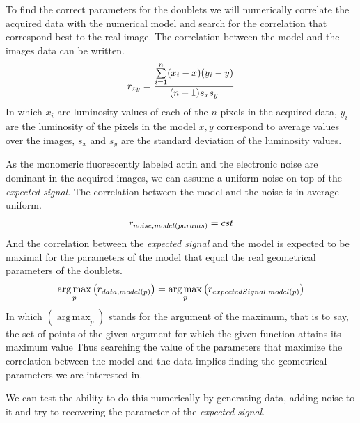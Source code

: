\documentclass[A4paperpaper,11pt,english]{sphinxmanual}
\begin{document}
To find the correct parameters for the doublets we will numerically correlate
the acquired data with the numerical model and search for the correlation
that correspond best to the real image. The correlation between the model and the images
data can be written.
\begin{gather}
\begin{split}r_{xy}=\frac{\sum\limits_{i=1}^n (x_i-\bar{x})(y_i-\bar{y})}{(n-1) s_x s_y}\end{split}\notag
\end{gather}
In which \(x_i\) are luminosity values of each of the \(n\) pixels in
the acquired data, \(y_i\) are the luminosity of the pixels in the model
\(\bar{x},\bar{y}\) correspond to average values over the images,
\(s_x\) and \(s_y\) are the standard deviation of the luminosity
values.

As the monomeric fluorescently labeled actin and the electronic noise are dominant
in the acquired images, we can assume a uniform noise on top of the \emph{expected signal}. The correlation between the model and the noise is in average
uniform.
\begin{gather}
\begin{split}r_{noise,model(params)} = cst\end{split}\notag
\end{gather}
And the correlation between the \emph{expected signal} and the model is expected to be
maximal for the parameters of the model that  equal the real geometrical
parameters of the doublets.
\begin{gather}
\begin{split}\operatorname*{arg\,max}_p\left(r_{data,model(p)}\right)= \operatorname*{arg\,max}_p \left(r_{expectedSignal,model(p)}\right)\end{split}\notag
\end{gather}
In which \(\left(\operatorname*{arg\,max}_p\right)\) stands for the
argument of the maximum, that is to say, the set of points of the given
argument for which the given function attains its maximum value Thus searching
the value of the parameters that maximize the correlation between the model and
the data implies finding the geometrical parameters we are interested in.

We can test the ability to do this numerically by generating data, adding noise
to it and try to recovering the parameter of the \emph{expected signal}.
\end{document}

